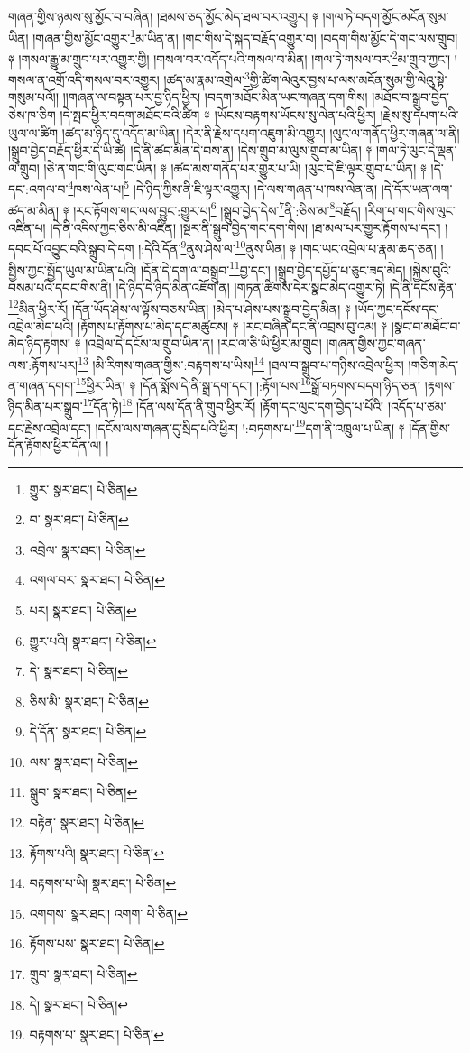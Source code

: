 གཞན་གྱིས་ཉམས་སུ་མྱོང་བ་བཞིན། །ཐམས་ཅད་མྱོང་མེད་ཐལ་བར་འགྱུར། ༈ །གལ་ཏེ་བདག་མྱོང་མངོན་སུམ་ཡིན། །གཞན་གྱིས་མྱོང་འགྱུར་\footnote{གྱུར་  སྣར་ཐང་།  པེ་ཅིན། }མ་ཡིན་ན། །གང་གིས་དེ་སྐད་བརྗོད་འགྱུར་བ། །བདག་གིས་མྱོང་དེ་གང་ལས་གྲུབ། ༈ །གསལ་རྒྱུ་མ་གྲུབ་པར་འགྱུར་གྱི། །གསལ་བར་འདོད་པའི་གསལ་བ་མིན། །གལ་ཏེ་གསལ་བར་\footnote{བ་  སྣར་ཐང་།  པེ་ཅིན། }མ་གྲུབ་ཀྱང་། །གསལ་ན་འགྲོ་འདི་གསལ་བར་འགྱུར། །ཚད་མ་རྣམ་འགྲེལ་\footnote{འབྲེལ་  སྣར་ཐང་།  པེ་ཅིན། }གྱི་ཚིག་ལེའུར་བྱས་པ་ལས་མངོན་སུམ་གྱི་ལེའུ་སྟེ་གསུམ་པའོ།། །།གཞན་ལ་བསྟན་པར་བྱ་ཉིད་ཕྱིར། །བདག་མཐོང་མིན་ཡང་གཞན་དག་གིས། །མཐོང་བ་སྒྲུབ་བྱེད་ཅེས་ཁ་ཅིག །དེ་སྤང་ཕྱིར་བདག་མཐོང་བའི་ཚིག ༈ །ཡོངས་བརྟགས་ཡོངས་སུ་ལེན་པའི་ཕྱིར། །རྗེས་སུ་དཔག་པའི་ཡུལ་ལ་ཚིག །ཚད་མ་ཉིད་དུ་འདོད་མ་ཡིན། །དེར་ནི་རྗེས་དཔག་འཇུག་མི་འགྱུར། །ལུང་ལ་གནོད་ཕྱིར་གཞན་ལ་ནི། །སྒྲུབ་བྱེད་བརྗོད་ཕྱིར་དེ་ཡི་ཚེ། །དེ་ནི་ཚད་མིན་དེ་བས་ན། །དེས་གྲུབ་མ་ལུས་གྲུབ་མ་ཡིན། ༈ །གལ་ཏེ་ལུང་དེ་ལྡན་ལ་གྲུབ། །ཅེ་ན་གང་གི་ལུང་གང་ཡིན། ༈ །ཚད་མས་གནོད་པར་གྱུར་པ་ཡི། །ལུང་དེ་ཇི་ལྟར་གྲུབ་པ་ཡིན། ༈ །དེ་དང་:འགལ་བ་\footnote{འགལ་བར་  སྣར་ཐང་།  པེ་ཅིན། }ཁས་ལེན་པ།\footnote{པར།  སྣར་ཐང་།  པེ་ཅིན། } །དེ་ཉིད་ཀྱིས་ནི་ཇི་ལྟར་འགྱུར། །དེ་ལས་གཞན་པ་ཁས་ལེན་ན། །དེ་དོར་ཡན་ལག་ཚད་མ་མིན། ༈ །རང་རྟོགས་གང་ལས་བྱུང་:གྱུར་པ།\footnote{གྱུར་པའི།  སྣར་ཐང་།  པེ་ཅིན། } །སྒྲུབ་བྱེད་དེས་\footnote{དེ་  སྣར་ཐང་།  པེ་ཅིན། }ནི་:ཅིས་མ་\footnote{ཅིས་མི་  སྣར་ཐང་།  པེ་ཅིན། }བརྗོད། །རིག་པ་གང་གིས་ལུང་འཛིན་པ། །དེ་ནི་འདིས་ཀྱང་ཅིས་མི་འཛིན། །སྔར་ནི་སྒྲུབ་བྱེད་གང་དག་གིས། །ཐ་མལ་པར་གྱུར་རྟོགས་པ་དང་། །དབང་པོ་འབྱུང་བའི་སྒྲུབ་དེ་དག །:དེའི་དོན་\footnote{དེ་དོན་  སྣར་ཐང་།  པེ་ཅིན། }ནུས་ཤེས་ལ་\footnote{ལས་  སྣར་ཐང་།  པེ་ཅིན། }ནུས་ཡིན། ༈ །གང་ཡང་འབྲེལ་པ་རྣམ་ཆད་ཅན། །སྤྱིས་ཀྱང་སྤྱོད་ཡུལ་མ་ཡིན་པའི། །དོན་དེ་དག་ལ་བསྒྲུབ་\footnote{སྒྲུབ་  སྣར་ཐང་།  པེ་ཅིན། }བྱ་དང་། །སྒྲུབ་བྱེད་དཔྱོད་པ་ཅུང་ཟད་མེད། །སྐྱེས་བུའི་བསམ་པའི་དབང་གིས་ནི། །དེ་ཉིད་དེ་ཉིད་མིན་འཇོག་ན། །གཏན་ཚིགས་དེར་སྣང་མེད་འགྱུར་ཏེ། །དེ་ནི་དངོས་རྟེན་\footnote{བརྟེན་  སྣར་ཐང་།  པེ་ཅིན། }མིན་ཕྱིར་རོ། །དོན་ཡོད་ཤེས་ལ་ལྟོས་བཅས་ཡིན། །མེད་པ་ཤེས་པས་སྒྲུབ་བྱེད་མིན། ༈ །ཡོད་ཀྱང་དངོས་དང་འབྲེལ་མེད་པའི། །རྟོགས་པ་རྟོགས་པ་མེད་དང་མཚུངས། ༈ །རང་བཞིན་དང་ནི་འབྲས་བུ་འམ། ༈ །སྣང་བ་མཐོང་བ་མེད་ཉིད་རྟགས། ༈ །འབྲེལ་དེ་དངོས་ལ་གྲུབ་ཡིན་ན། །རང་ལ་ཅི་ཡི་ཕྱིར་མ་གྲུབ། །གཞན་གྱིས་ཀྱང་གཞན་ལས་:རྟོགས་པར།\footnote{རྟོགས་པའི།  སྣར་ཐང་།  པེ་ཅིན། } །མི་རིགས་གཞན་གྱིས་:བརྟགས་པ་ཡིས།\footnote{བརྟགས་པ་ཡི།  སྣར་ཐང་།  པེ་ཅིན། } །ཐལ་བ་སྒྲུབ་པ་གཉིས་འབྲེལ་ཕྱིར། །གཅིག་མེད་ན་གཞན་དགག་\footnote{འགགས་  སྣར་ཐང་། འགག་  པེ་ཅིན། }ཕྱིར་ཡིན། ༈ །དོན་སྨོས་དེ་ནི་སྒྲ་དག་དང་། །:རྟོག་པས་\footnote{རྟོགས་པས་  སྣར་ཐང་།  པེ་ཅིན། }སྒྲོ་བཏགས་བདག་ཉིད་ཅན། །རྟགས་ཉིད་མིན་པར་སྒྲུབ་\footnote{གྲུབ་  སྣར་ཐང་།  པེ་ཅིན། }དོན་ཏེ།\footnote{དེ།  སྣར་ཐང་།  པེ་ཅིན། } །དོན་ལས་དོན་ནི་གྲུབ་ཕྱིར་རོ། །རྟོག་དང་ལུང་དག་བྱེད་པ་པོའི། །འདོད་པ་ཙམ་དང་རྗེས་འབྲེལ་དང་། །དངོས་ལས་གཞན་དུ་སྲིད་པའི་ཕྱིར། །:བཏགས་པ་\footnote{བརྟགས་པ་  སྣར་ཐང་།  པེ་ཅིན། }དག་ནི་འཁྲུལ་པ་ཡིན། ༈ །དོན་གྱིས་དོན་རྟོགས་ཕྱིར་དོན་ལ། །
